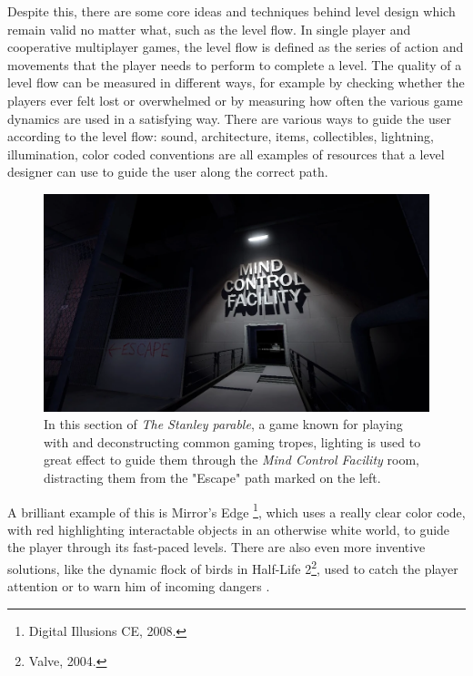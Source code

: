 Despite this, there are some core ideas and techniques behind level design which remain valid no matter what, such as the level flow. In single player and cooperative multiplayer games, the level flow is defined as the series of action and movements that the player needs to perform to complete a level. The quality of a level flow can be measured in different ways, for example by checking whether the players ever felt lost or overwhelmed or by measuring how often the various game dynamics are used in a satisfying way.
There are various ways to guide the user according to the level flow: sound, architecture, items, collectibles, lightning, illumination, color coded conventions are all examples of resources that a level designer can use to guide the user along the correct path. 

\begin{figure}[hbpt]
\centering
  \includegraphics[width=0.8\linewidth]{Images/images/stanley_parable.png}
  \caption[Usage of lighting is The Stanley Parable]{In this section of \textit{The Stanley parable}\footnotemark, a game known for playing with and deconstructing common gaming tropes, lighting is used to great effect to guide them through the \textit{Mind Control Facility} room, distracting them from the "Escape" path marked on the left.}
  \label{fig:stanley_parable}
\end{figure}

A brilliant example of this is Mirror’s Edge \footnote{Digital Illusions CE, 2008.
}, which uses a really clear color code, with red highlighting interactable objects in an otherwise white world, to guide the player through its fast-paced levels. There are also even more inventive solutions, like the dynamic flock of birds in Half-Life 2\footnote{Valve, 2004.}, used to catch the player attention or to warn him of incoming dangers \cite{half_life_2}.

